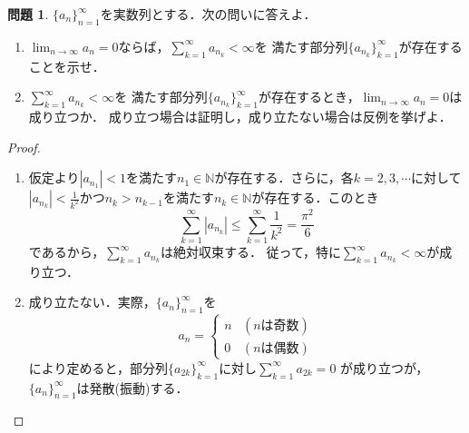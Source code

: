 \documentclass{jsarticle}
\theoremstyle{definition}
\newtheorem{qst}{問題}
\begin{document}
\begin{qst}
$\{a_n\}_{n=1}^\infty$を実数列とする．次の問いに答えよ．
\begin{enumerate}
\item $\displaystyle\lim_{n\to\infty}a_n=0$ならば，$\displaystyle\sum_{k=1}^\infty a_{n_k}<\infty$を
満たす部分列$\{a_{n_k}\}_{k=1}^\infty$が存在することを示せ．
\item $\displaystyle\sum_{k=1}^\infty a_{n_k}<\infty$を
満たす部分列$\{a_{n_k}\}_{k=1}^\infty$が存在するとき，$\displaystyle\lim_{n\to\infty}a_n=0$は成り立つか．
成り立つ場合は証明し，成り立たない場合は反例を挙げよ．
\end{enumerate}
\end{qst}
\begin{proof}
\begin{enumerate}
\item
仮定より$|a_{n_1}|<1$を満たす$n_1\in\mathbb{N}$が存在する．さらに，各$k=2,3,\cdots$に対して
$|a_{n_k}|<\frac{1}{k^2}$かつ$n_k>n_{k-1}$を満たす$n_k\in\mathbb{N}$が存在する．このとき
\[ \sum_{k=1}^\infty|a_{n_k}|\leq\sum_{k=1}^\infty\frac{1}{k^2}=\frac{\pi^2}{6} \]
であるから，$\displaystyle\sum_{k=1}^\infty a_{n_k}$は絶対収束する．
従って，特に$\displaystyle\sum_{k=1}^\infty a_{n_k}<\infty$が成り立つ．
\item
成り立たない．実際，$\{a_n\}_{n=1}^\infty$を
\[ a_n=\begin{cases}n & (n\text{は奇数}) \\ 0 & (n\text{は偶数})\end{cases} \]
により定めると，部分列$\{a_{2k}\}_{k=1}^\infty$に対し$\displaystyle\sum_{k=1}^\infty a_{2k}=0$
が成り立つが，$\{a_n\}_{n=1}^\infty$は発散(振動)する．
\end{enumerate}
\end{proof}
\end{document}
